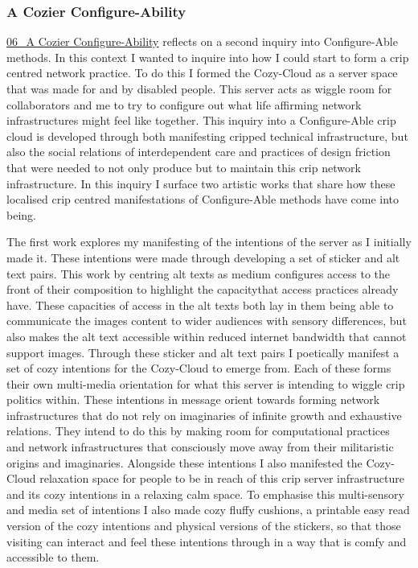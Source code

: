 \hypertarget{a-cozier-configure-ability}{%
\subsubsection[A Cozier
Configure-Ability]{\texorpdfstring{\protect\hypertarget{anchor}{}{}A
Cozier
Configure-Ability}{A Cozier Configure-Ability}}\label{a-cozier-configure-ability}}

\href{../../06_A\%20Cozier\%20Configure-Ability/06_A\%20Cozier\%20Configure-Ability.md}{06\_A
Cozier Configure-Ability} reflects on a second inquiry into
Configure-Able methods. In this context I wanted to inquire into how I
could start to form a crip centred network practice. To do this I formed
the Cozy-Cloud as a server space that was made for and by disabled
people. This server acts as wiggle room for collaborators and me to try
to configure out what life affirming network infrastructures might feel
like together. This inquiry into a Configure-Able crip cloud is
developed through both manifesting cripped technical infrastructure, but
also the social relations of interdependent care and practices of design
friction that were needed to not only produce but to maintain this crip
network infrastructure. In this inquiry I surface two artistic works
that share how these localised crip centred manifestations of
Configure-Able methods have come into being.

The first work explores my manifesting of the intentions of the server
as I initially made it. These intentions were made through developing a
set of sticker and alt text pairs. This work by centring alt texts as
medium configures access to the front of their composition to highlight
the capacitythat access practices already have. These capacities of
access in the alt texts both lay in them being able to communicate the
images content to wider audiences with sensory differences, but also
makes the alt text accessible within reduced internet bandwidth that
cannot support images. Through these sticker and alt text pairs I
poetically manifest a set of cozy intentions for the Cozy-Cloud to
emerge from. Each of these forms their own multi-media orientation for
what this server is intending to wiggle crip politics within. These
intentions in message orient towards forming network infrastructures
that do not rely on imaginaries of infinite growth and exhaustive
relations. They intend to do this by making room for computational
practices and network infrastructures that consciously move away from
their militaristic origins and imaginaries. Alongside these intentions I
also manifested the Cozy-Cloud relaxation space for people to be in
reach of this crip server infrastructure and its cozy intentions in a
relaxing calm space. To emphasise this multi-sensory and media set of
intentions I also made cozy fluffy cushions, a printable easy read
version of the cozy intentions and physical versions of the stickers, so
that those visiting can interact and feel these intentions through in a
way that is comfy and accessible to them.

